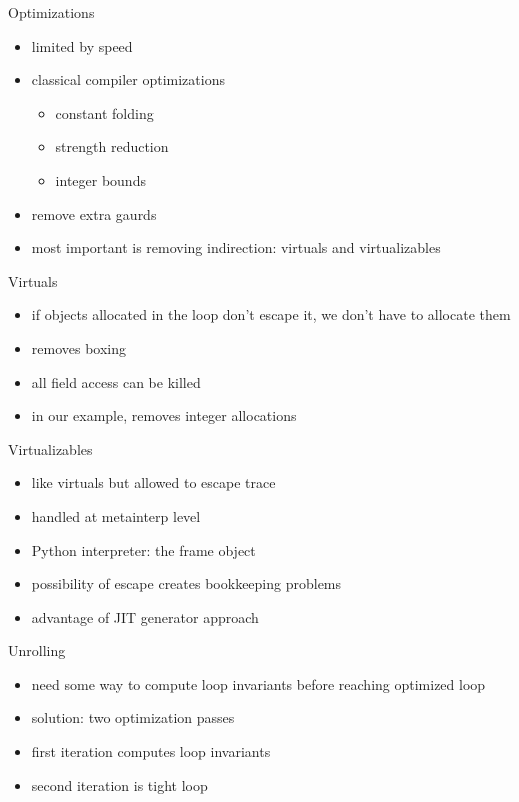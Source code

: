 \documentclass[14pt]{beamer}
\begin{document}
\begin{frame}{Optimizations}
\begin{itemize}
\item limited by speed
\item classical compiler optimizations
\begin{itemize}
\item constant folding
\item strength reduction
\item integer bounds
\end{itemize}
\item remove extra gaurds
\item most important is removing indirection: virtuals and virtualizables
\end{itemize}
\end{frame}

\begin{frame}{Virtuals}
\begin{itemize}
\item if objects allocated in the loop don't escape it, we don't have to
  allocate them
\item removes boxing
\item all field access can be killed
\item in our example, removes integer allocations
\end{itemize}
\end{frame}

\begin{frame}{Virtualizables}
\begin{itemize}
\item like virtuals but allowed to escape trace
\item handled at metainterp level
\item Python interpreter: the frame object
\item possibility of escape creates bookkeeping problems
\item advantage of JIT generator approach
\end{itemize}
\end{frame}

\begin{frame}{Unrolling}
\begin{itemize}
\item need some way to compute loop invariants before reaching optimized loop
\item solution: two optimization passes
\item first iteration computes loop invariants
\item second iteration is tight loop
\end{itemize}
\end{frame}
\end{document}

